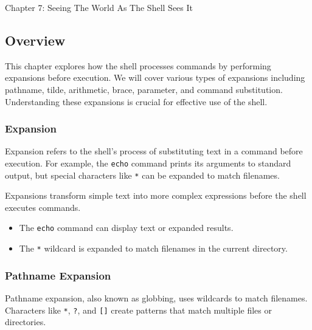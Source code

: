 \begin{notes}{Chapter 7: Seeing The World As The Shell Sees It}
    \subsection*{Overview}

    This chapter explores how the shell processes commands by performing expansions before execution. We will cover various types of expansions including pathname, tilde, arithmetic, brace, 
    parameter, and command substitution. Understanding these expansions is crucial for effective use of the shell.
    
    \subsubsection*{Expansion}
    
    Expansion refers to the shell's process of substituting text in a command before execution. For example, the \texttt{echo} command prints its arguments to standard output, but special characters 
    like \texttt{*} can be expanded to match filenames.
    
    \begin{highlight}[Expansion]
    
    Expansions transform simple text into more complex expressions before the shell executes commands.
    
    \begin{itemize}
        \item The \texttt{echo} command can display text or expanded results.
        \item The \texttt{*} wildcard is expanded to match filenames in the current directory.
    \end{itemize}
    
    \end{highlight}
    
    \subsubsection*{Pathname Expansion}
    
    Pathname expansion, also known as globbing, uses wildcards to match filenames. Characters like \texttt{*}, \texttt{?}, and \texttt{[]} create patterns that match multiple files or directories.
    
    \begin{highlight}
    

\end{highlight}
\end{notes}
